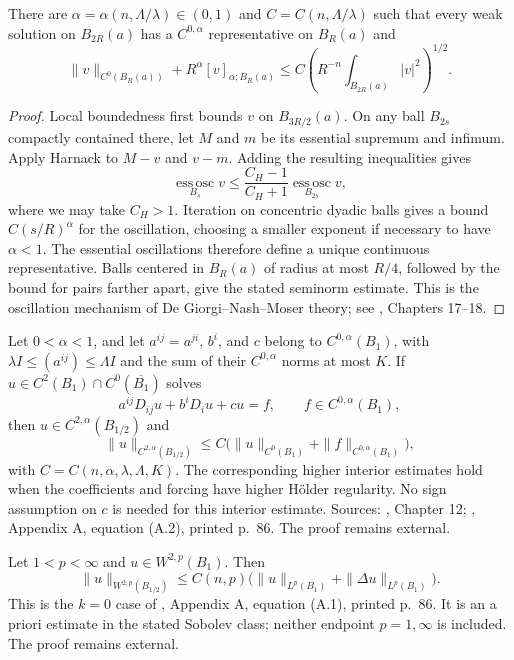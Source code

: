 \begin{corollary}\label{cor:elliptic-holder}
There are $\alpha=\alpha(n,\Lambda/\lambda)\in(0,1)$ and $C=C(n,\Lambda/\lambda)$ such that every weak solution on $B_{2R}(a)$ has a $C^{0,\alpha}$ representative on $B_R(a)$ and
\[
 \|v\|_{C^0(B_R(a))}+R^\alpha[v]_{\alpha;B_R(a)}
 \leq C\left(R^{-n}\int_{B_{2R}(a)}|v|^2\right)^{1/2}.
\]
\end{corollary}
\begin{proof}
Local boundedness first bounds $v$ on $B_{3R/2}(a)$. On any ball $B_{2s}$ compactly contained there, let $M$ and $m$ be its essential supremum and infimum. Apply Harnack to $M-v$ and $v-m$. Adding the resulting inequalities gives
\[
 \operatorname*{ess\,osc}_{B_s}v\leq
 \frac{C_H-1}{C_H+1}\operatorname*{ess\,osc}_{B_{2s}}v,
\]
where we may take $C_H>1$. Iteration on concentric dyadic balls gives a bound $C(s/R)^\alpha$ for the oscillation, choosing a smaller exponent if necessary to have $\alpha<1$. The essential oscillations therefore define a unique continuous representative. Balls centered in $B_R(a)$ of radius at most $R/4$, followed by the bound for pairs farther apart, give the stated seminorm estimate. This is the oscillation mechanism of De Giorgi--Nash--Moser theory; see \cite{SimonPDE}, Chapters 17--18.
\end{proof}

\begin{theorem}\label{thm:interior-schauder}
Let $0<\alpha<1$, and let $a^{ij}=a^{ji}$, $b^i$, and $c$ belong to $C^{0,\alpha}(B_1)$, with $\lambda I\leq(a^{ij})\leq\Lambda I$ and the sum of their $C^{0,\alpha}$ norms at most $K$. If $u\in C^2(B_1)\cap C^0(\overline{B_1})$ solves
\[
 a^{ij}D_{ij}u+b^iD_i u+cu=f,\qquad f\in C^{0,\alpha}(B_1),
\]
then $u\in C^{2,\alpha}(B_{1/2})$ and
\[
 \|u\|_{C^{2,\alpha}(B_{1/2})}\leq C\bigl(\|u\|_{C^0(B_1)}+\|f\|_{C^{0,\alpha}(B_1)}\bigr),
\]
with $C=C(n,\alpha,\lambda,\Lambda,K)$. The corresponding higher interior estimates hold when the coefficients and forcing have higher Hölder regularity. No sign assumption on $c$ is needed for this interior estimate. Sources: \cite{SimonPDE}, Chapter 12; \cite{ChMin}, Appendix A, equation (A.2), printed p.~86. The proof remains external.
\end{theorem}

\begin{theorem}\label{thm:laplace-w2p}
Let $1<p<\infty$ and $u\in W^{2,p}(B_1)$. Then
\[
 \|u\|_{W^{2,p}(B_{1/2})}\leq C(n,p)
 \bigl(\|u\|_{L^p(B_1)}+\|\Delta u\|_{L^p(B_1)}\bigr).
\]
This is the $k=0$ case of \cite{ChMin}, Appendix A, equation (A.1), printed p.~86. It is an a priori estimate in the stated Sobolev class; neither endpoint $p=1,\infty$ is included. The proof remains external.
\end{theorem}

